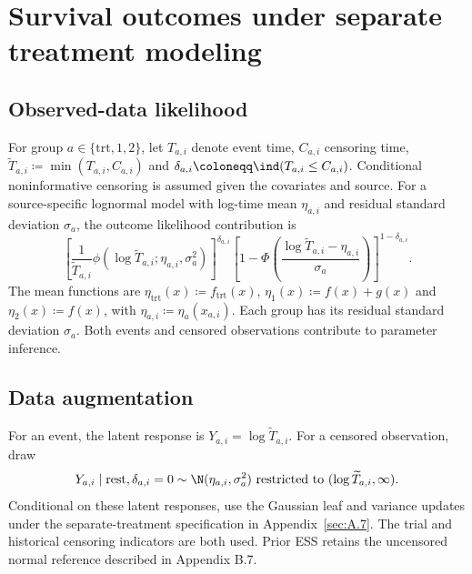 \section{Survival outcomes under separate treatment modeling}\label{sec:D}
\subsection{Observed-data likelihood}\label{sec:D.1}
For group $a\in\{\mathrm{trt},1,2\}$, let $T_{a,i}$ denote event time, $C_{a,i}$ censoring time, $\widetilde T_{a,i}\coloneqq \min(T_{a,i},C_{a,i})$ and $\delta_{a,i}\coloneqq \ind(T_{a,i}\leq C_{a,i})$. Conditional noninformative censoring is assumed given the covariates and source. For a source-specific lognormal model with log-time mean $\eta_{a,i}$ and residual standard deviation $\sigma_a$, the outcome likelihood contribution is
\begin{equation}
\left[\frac{1}{\widetilde T_{a,i}}\phi(\log\widetilde T_{a,i};\eta_{a,i},\sigma_a^2)\right]^{\delta_{a,i}}
\left[1-\Phi\left(\frac{\log\widetilde T_{a,i}-\eta_{a,i}}{\sigma_a}\right)\right]^{1-\delta_{a,i}}.
\end{equation}
The mean functions are $\eta_{\mathrm{trt}}(x)\coloneqq f_{\mathrm{trt}}(x)$, $\eta_{1}(x)\coloneqq f(x)+g(x)$ and $\eta_{2}(x)\coloneqq f(x)$, with $\eta_{a,i}\coloneqq \eta_a(x_{a,i})$. Each group has its residual standard deviation $\sigma_a$. Both events and censored observations contribute to parameter inference.

\subsection{Data augmentation}\label{sec:D.2}
For an event, the latent response is $Y_{a,i}=\log\widetilde T_{a,i}$. For a censored observation, draw
\begin{equation}
Y_{a,i}\mid\text{rest},\delta_{a,i}=0\sim
\N(\eta_{a,i},\sigma_a^2)\text{ restricted to }(\log\widetilde T_{a,i},\infty).
\end{equation}
Conditional on these latent responses, use the Gaussian leaf and variance updates under the separate-treatment specification in Appendix~\ref{sec:A.7}. The trial and historical censoring indicators are both used. Prior ESS retains the uncensored normal reference described in Appendix B.7.


